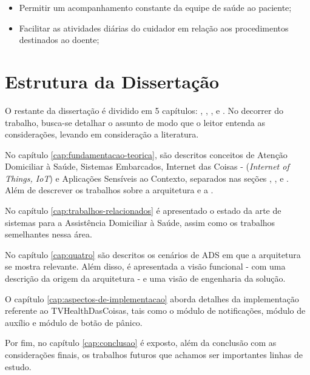 \begin{itemize}
  \item Permitir um acompanhamento constante da equipe de saúde ao paciente;
  \item Facilitar as atividades diárias do cuidador em relação aos procedimentos
  destinados ao doente;
\end{itemize}

\section{Estrutura da Dissertação}\label{sec:estrutura}

O restante da dissertação é dividido em 5 capítulos: ,
, , 
e . No decorrer do trabalho, busca-se detalhar o assunto de modo que o
leitor entenda as considerações, levando em consideração a literatura. 

No capítulo \ref{cap:fundamentacao-teorica}, são descritos conceitos de Atenção
Domiciliar à Saúde, Sistemas Embarcados, Internet das Coisas -
(\textit{Internet of Things, IoT}) e Aplicações Sensíveis ao Contexto,
separados nas seções , ,
 e . Além de descrever os trabalhos sobre
a arquitetura  e a .

No capítulo \ref{cap:trabalhos-relacionados} é apresentado o estado da arte de
sistemas para a Assistência Domiciliar à Saúde, assim como os trabalhos semelhantes
nessa área.

No capítulo \ref{cap:quatro} são descritos os cenários de ADS em que a arquitetura
se mostra relevante. Além disso, é apresentada a visão funcional - com uma descrição
da origem da arquitetura - e uma visão de engenharia da solução.

O capítulo \ref{cap:aspectos-de-implementacao} aborda detalhes da implementação
referente ao TVHealthDasCoisas, tais como o módulo de notificações, módulo de 
auxílio e módulo de botão de pânico.

Por fim, no capítulo \ref{cap:conclusao} é exposto, além da conclusão com as 
considerações finais, os trabalhos futuros que achamos ser importantes linhas
de estudo.

